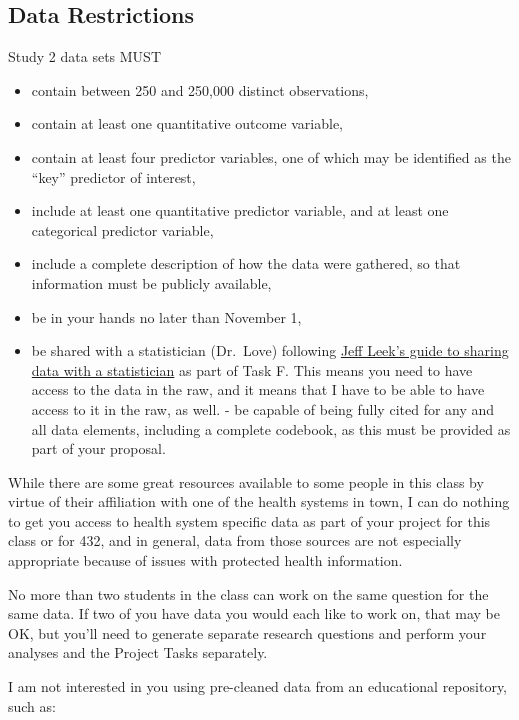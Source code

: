 \documentclass[]{book}
\providecommand{\tightlist}{%
  \setlength{\itemsep}{0pt}\setlength{\parskip}{0pt}}
\theoremstyle{definition}
\theoremstyle{definition}
\theoremstyle{definition}
\theoremstyle{remark}
\begin{document}
\hypertarget{data-restrictions}{%
\subsection{Data Restrictions}\label{data-restrictions}}

Study 2 data sets MUST

\begin{itemize}
\tightlist
\item
  contain between 250 and 250,000 distinct observations,
\item
  contain at least one quantitative outcome variable,
\item
  contain at least four predictor variables, one of which may be
  identified as the ``key'' predictor of interest,
\item
  include at least one quantitative predictor variable, and at least one
  categorical predictor variable,
\item
  include a complete description of how the data were gathered, so that
  information must be publicly available,
\item
  be in your hands no later than November 1,
\item
  be shared with a statistician (Dr.~Love) following
  \href{https://github.com/jtleek/datasharing}{Jeff Leek's guide to
  sharing data with a statistician} as part of Task F. This means you
  need to have access to the data in the raw, and it means that I have
  to be able to have access to it in the raw, as well. - be capable of
  being fully cited for any and all data elements, including a complete
  codebook, as this must be provided as part of your proposal.
\end{itemize}

While there are some great resources available to some people in this
class by virtue of their affiliation with one of the health systems in
town, I can do nothing to get you access to health system specific data
as part of your project for this class or for 432, and in general, data
from those sources are not especially appropriate because of issues with
protected health information.

No more than two students in the class can work on the same question for
the same data. If two of you have data you would each like to work on,
that may be OK, but you'll need to generate separate research questions
and perform your analyses and the Project Tasks separately.

I am not interested in you using pre-cleaned data from an educational
repository, such as:
\end{document}
